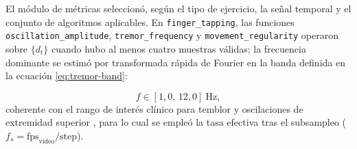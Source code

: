 \begin{sloppypar}
El módulo de métricas seleccionó, según el tipo de ejercicio, la señal temporal y el conjunto de algoritmos aplicables. En \texttt{finger\_tapping}, las funciones \texttt{oscillation\_\allowbreak{}amplitude}, \texttt{tremor\_\allowbreak{}frequency} y \texttt{movement\_\allowbreak{}regularity} operaron sobre $\{d_t\}$ cuando hubo al menos cuatro muestras válidas; la frecuencia dominante se estimó por transformada rápida de Fourier en la banda definida en la ecuación \ref{eq:tremor-band}:
\end{sloppypar}
\begin{equation}
f \in [1{,}0,\, 12{,}0]\ \text{Hz},
\label{eq:tremor-band}
\end{equation}
coherente con el rango de interés clínico para temblor y oscilaciones de extremidad superior \citep{pecoraro2025computer}, para lo cual se empleó la tasa efectiva tras el subsampleo ($f_s = \mathrm{fps}_{\mathrm{video}} / \mathrm{step}$).

